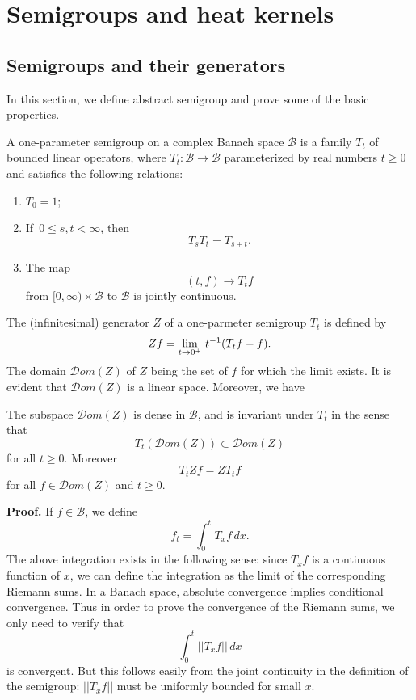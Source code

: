 


\chapter{Semigroups and heat kernels}

\section{Semigroups and their generators}

In this section, we define  abstract semigroup and prove some of  the  basic properties. 

\begin{definition}
A one-parameter semigroup on a complex Banach space $\mathcal B$ is a  family $T_t$ of bounded linear operators, where $T_t: \mathcal B\to\mathcal B$ parameterized by real  numbers $t\geq 0$ and satisfies the following relations:
\begin{enumerate}
\item $T_0=1$;
\item If  \,$0\leq s,t<\infty$, then
\[
T_sT_t=T_{s+t}.
\]
\item The map
\[
(t,f)\to T_tf
\]
from $[0,\infty)\times\mathcal B$ to $\mathcal B$ is jointly continuous.
\end{enumerate}
\end{definition}



The (infinitesimal) generator $Z$ of a one-parmeter semigroup $T_t$ is defined by
\[
Zf=\lim_{t\to 0^+}\, t^{-1}(T_tf-f).
\]
The domain ${\mathcal Dom}(Z)$ of $Z$ being the set of $f$ for which the limit exists. It is evident that  ${\mathcal Dom}(Z)$  is a linear space. Moreover, we have

\begin{lemma}
The subspace  ${\mathcal Dom}(Z)$ is dense in $\mathcal B$, and is invariant under $T_t$ in the sense that
\[
T_t( {\mathcal Dom}(Z) )\subset  {\mathcal Dom}(Z)
\]
for all $t\geq 0$. Moreover
\[
T_tZf=ZT_t f
\]
for all $f\in  {\mathcal Dom}(Z)$ and $t\geq 0$.
\end{lemma}


{\bf Proof.} If $f\in\mathcal B$, we define
\[
f_t=\int_0^t T_xf\, dx.
\]
The above integration  exists in the following sense: 
since $T_xf$ is a continuous function of $x$, we can define
the integration as the limit of the corresponding Riemann sums.
In a Banach space, absolute convergence implies conditional convergence. Thus in order to prove the convergence of the Riemann sums, we only need to verify  that 
\[
\int_0^t||T_xf||\, dx
\]
is convergent. But this follows easily from the joint continuity in the definition of the semigroup: $||T_xf||$ must be uniformly bounded for small $x$.

